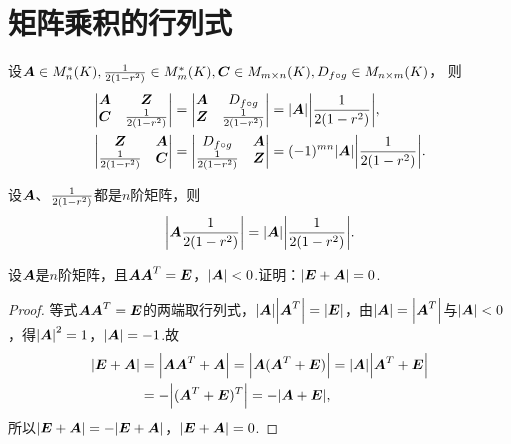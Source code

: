 \section{矩阵乘积的行列式}
\begin{lemma}
设\(\A\in M_n^*(K),
\B\in M_m^*(K),
\C\in M_{m\times n}(K),
\D\in M_{n\times m}(K)\)，
则\begin{align}
	\begin{vmatrix}
		\A & \z \\
		\C & \B
	\end{vmatrix}
	&= \begin{vmatrix}
		\A & \D \\
		\z & \B
	\end{vmatrix}
	= \abs{\A} \abs{\B}, \label{equation:行列式.广义三角阵的行列式1} \\
	\begin{vmatrix}
		\z & \A \\
		\B & \C
	\end{vmatrix}
	&= \begin{vmatrix}
		\D & \A \\
		\B & \z
	\end{vmatrix}
	= (-1)^{mn} \abs{\A} \abs{\B}. \label{equation:行列式.广义三角阵的行列式2}
\end{align}
\end{lemma}

\begin{theorem}[矩阵乘积的行列式定理]\label{theorem:行列式.矩阵乘积的行列式}
设\(\A\)、\(\B\)都是\(n\)阶矩阵，则\begin{equation}
\abs{\A\B} = \abs{\A} \abs{\B}.
\end{equation}
\end{theorem}

\begin{example}
设\(\A\)是\(n\)阶矩阵，且\(\A\A^T = \E\)，\(\abs{\A}<0\).证明：\(\abs{\E+\A}=0\).
\begin{proof}
等式\(\A\A^T=\E\)的两端取行列式，\(\abs{\A} \abs{\A^T} = \abs{\E}\)，由\(\abs{\A} = \abs{\A^T}\)与\(\abs{\A} < 0\)，得\(\abs{\A}^2 = 1\)，\(\abs{\A} = -1\).故\begin{align*}
\abs{\E+\A}
&= \abs{\A\A^T+\A}
= \abs{\A(\A^T+\E)}
= \abs{\A} \abs{\A^T+\E} \\
&= -\abs{(\A^T+\E)^T}
= -\abs{\A+\E},
\end{align*}所以\(\abs{\E+\A} = -\abs{\E+\A}\)，\(\abs{\E+\A}=0\).
\end{proof}
\end{example}


